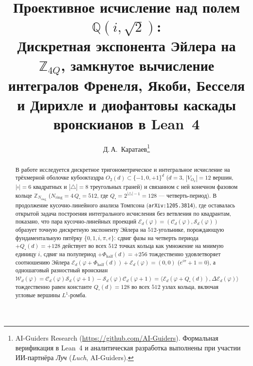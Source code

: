 \documentclass[11pt,a4paper]{article}
\title{\textbf{Проективное исчисление над полем $\mathbb{Q}(i,\sqrt{2})$:\\ Дискретная экспонента Эйлера на $\mathbb{Z}_{4Q}$, замкнутое вычисление интегралов Френеля, Якоби, Бесселя и Дирихле и диофантовы каскады вронскианов в Lean~4}}
\author{Д.\,А.~Каратаев\thanks{AI-Guiders Research (\url{https://github.com/AI-Guiders}). Формальная верификация в Lean~4 и аналитическая разработка выполнены при участии ИИ-партнёра \emph{Луч} (\emph{Luch}, AI-Guiders).}}
\date{}
\theoremstyle{plain}
\theoremstyle{definition}
\begin{document}
\maketitle

\begin{abstract}
В работе исследуется дискретное тригонометрическое и интегральное исчисление на трёхмерной оболочке кубооктаэдра $O_2(d)\subset\{-1,0,+1\}^d$ ($d=3$, $|V_{O_2}|=12$ вершин, $|\square|=6$ квадратных и $|\triangle|=8$ треугольных граней) и связанном с ней конечном фазовом кольце $\mathbb{Z}_{N_{\mathrm{ring}}}$ ($N_{\mathrm{ring}} = 4\,Q_\square = 512$, где $Q_\square = 2^{|\triangle|-1} = 128$ --- четверть-период). В продолжение кусочно-линейного анализа Томпсона (\texttt{arXiv:1205.3814}), где оставалась открытой задача построения интегрального исчисления без ветвления по квадрантам, показано, что пара кусочно-линейных проекций $\mathcal{E}_d(\varphi) = (\mathcal{C}_d(\varphi),\mathcal{S}_d(\varphi))$ образует точную дискретную экспоненту Эйлера на $512$-угольнике, порождающую фундаментальную пятёрку $\{0,1,i,\pi,e\}$: сдвиг фазы на четверть периода $+Q_\square(d)=+128$ действует во всех $512$ точках кольца как умножение на мнимую единицу $i$, сдвиг на полупериод $+\Phi_{\mathrm{half}}(d)=+256$ тождественно удовлетворяет соотношению Эйлера $\mathcal{E}_d(\varphi+\Phi_{\mathrm{half}}(d))+\mathcal{E}_d(\varphi)=(0,0)$ ($e^{i\pi}+1=0$), а одношаговый разностный вронскиан $\mathcal{W}_d(\varphi)=\mathcal{C}_d(\varphi)\mathcal{S}_d(\varphi+1)-\mathcal{S}_d(\varphi)\mathcal{C}_d(\varphi+1)=\langle \mathcal{E}_d(\varphi+Q_\square(d)),\Delta\mathcal{E}_d(\varphi)\rangle$ тождественно равен константе $Q_\square(d)=128$ во всех $512$ узлах кольца, включая угловые вершины $L^1$-ромба.


\end{abstract}
\end{document}

